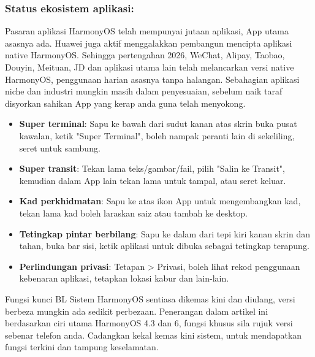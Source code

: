\subsubsection*{Status ekosistem aplikasi:}

Pasaran aplikasi HarmonyOS telah mempunyai jutaan aplikasi, App utama asasnya ada. Huawei juga aktif menggalakkan pembangun mencipta aplikasi native HarmonyOS. Sehingga pertengahan 2026, WeChat, Alipay, Taobao, Douyin, Meituan, JD dan aplikasi utama lain telah melancarkan versi native HarmonyOS, penggunaan harian asasnya tanpa halangan. Sebahagian aplikasi niche dan industri mungkin masih dalam penyesuaian, sebelum naik taraf disyorkan sahikan App yang kerap anda guna telah menyokong.


\begin{itemize}
  \item \textbf{Super terminal}: Sapu ke bawah dari sudut kanan atas skrin buka pusat kawalan, ketik "Super Terminal", boleh nampak peranti lain di sekeliling, seret untuk sambung.
  \item \textbf{Super transit}: Tekan lama teks/gambar/fail, pilih "Salin ke Transit", kemudian dalam App lain tekan lama untuk tampal, atau seret keluar.
  \item \textbf{Kad perkhidmatan}: Sapu ke atas ikon App untuk mengembangkan kad, tekan lama kad boleh laraskan saiz atau tambah ke desktop.
  \item \textbf{Tetingkap pintar berbilang}: Sapu ke dalam dari tepi kiri kanan skrin dan tahan, buka bar sisi, ketik aplikasi untuk dibuka sebagai tetingkap terapung.
  \item \textbf{Perlindungan privasi}: Tetapan > Privasi, boleh lihat rekod penggunaan kebenaran aplikasi, tetapkan lokasi kabur dan lain-lain.
\end{itemize}

\begin{tcbwarn}{Fungsi kunci BL}
Sistem HarmonyOS sentiasa dikemas kini dan diulang, versi berbeza mungkin ada sedikit perbezaan. Penerangan dalam artikel ini berdasarkan ciri utama HarmonyOS 4.3 dan 6, fungsi khusus sila rujuk versi sebenar telefon anda. Cadangkan kekal kemas kini sistem, untuk mendapatkan fungsi terkini dan tampung keselamatan.

\end{tcbwarn}

